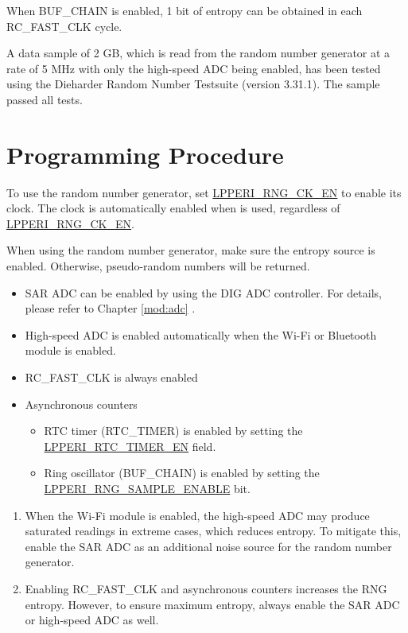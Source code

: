 \documentclass[main\_\_EN.tex]{subfiles}
\begin{document}
When BUF\_CHAIN is enabled, 1 bit of entropy can be obtained in each RC\_FAST\_CLK cycle.

A data sample of 2 GB, which is read from the random number generator at a rate of 5 MHz with only the high-speed ADC being enabled, has been tested using the Dieharder Random Number Testsuite (version 3.31.1). The sample passed all tests.


\section{Programming Procedure}

To use the random number generator, set \hyperref[fielddesc:LPPERIRNGCKEN]{LPPERI\_RNG\_CK\_EN} to enable its clock. The clock is automatically enabled when  is used, regardless of
\hyperref[fielddesc:LPPERIRNGCKEN]{LPPERI\_RNG\_CK\_EN}.

When using the random number generator, make sure the entropy source is enabled. Otherwise, pseudo-random numbers will be returned.
\begin{itemize}
    \item SAR ADC can be enabled by using the DIG ADC controller. For details, please refer to Chapter \ref{mod:adc} \textit{}.
    \item High-speed ADC is enabled automatically when the Wi-Fi or Bluetooth module is enabled.
    \item RC\_FAST\_CLK is always enabled
    \item Asynchronous counters
        \begin{itemize}
            \item RTC timer (RTC\_TIMER) is enabled by setting the \hyperref[fielddesc:LPPERIRTCTIMEREN]{LPPERI\_RTC\_TIMER\_EN} field.
            \item Ring oscillator (BUF\_CHAIN) is enabled by setting the \hyperref[fielddesc:LPPERIRNGSAMPLEENABLE]{LPPERI\_RNG\_SAMPLE\_ENABLE} bit.
        \end{itemize}
\end{itemize}
\newpage
\begin{tiplisting}\label{others:rng-note-clock-seed}
\vspace{-2.5em}
\begin{enumerate}
    \item When the Wi-Fi module is enabled, the high-speed ADC may produce saturated readings in extreme cases, which reduces entropy. To mitigate this, enable the SAR ADC as an additional noise source for the random number generator.
    \item Enabling RC\_FAST\_CLK and asynchronous counters increases the RNG entropy. However, to ensure maximum entropy, always enable the SAR ADC or high-speed ADC as well.
\end{enumerate}
\end{tiplisting}
\end{document}
